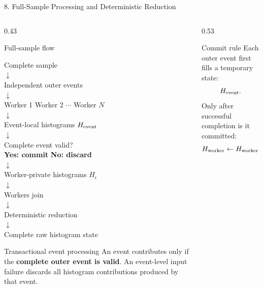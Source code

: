 \documentclass{beamer}
\begin{document}
\begin{frame}{8. Full-Sample Processing and Deterministic Reduction}
\fontsize{6.5}{7.3}\selectfont

\begin{columns}[T]

\begin{column}{0.43\textwidth}
\begin{block}{Full-sample flow}
\begin{center}
Complete sample\\[-0.15em]
$\downarrow$\\[-0.15em]
Independent outer events\\[-0.15em]
$\downarrow$\\[-0.15em]
Worker 1 \quad Worker 2 \quad $\cdots$ \quad Worker $N$\\[-0.15em]
$\downarrow$\\[-0.15em]
Event-local histograms $H_{\rm event}$\\[-0.15em]
$\downarrow$\\[-0.15em]
Complete event valid?\\[-0.15em]
\textbf{Yes: commit} \qquad \textbf{No: discard}\\[-0.15em]
$\downarrow$\\[-0.15em]
Worker-private histograms $H_i$\\[-0.15em]
$\downarrow$\\[-0.15em]
Workers join\\[-0.15em]
$\downarrow$\\[-0.15em]
Deterministic reduction\\[-0.15em]
$\downarrow$\\[-0.15em]
Complete raw histogram state
\end{center}
\end{block}

\vspace{-0.25em}
\begin{alertblock}{Transactional event processing}
An event contributes only if the \textbf{complete outer event is valid}. An event-level input failure discards all histogram contributions produced by that event.
\end{alertblock}
\end{column}

\begin{column}{0.53\textwidth}
\begin{block}{Commit rule}
Each outer event first fills a temporary state:
\[
H_{\rm event}.
\]
Only after successful completion is it committed:
\[
H_{\rm worker}\leftarrow H_{\rm worker}+H_{\rm event}.
\]
\end{block}


\end{column}
\end{columns}
\end{frame}
\end{document}
